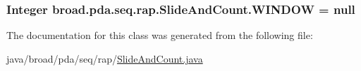 \hypertarget{classbroad_1_1pda_1_1seq_1_1rap_1_1_slide_and_count_a9be89664b1e7b15d1a5a5e9bfae6b3cb}{
\subsubsection[{W\+I\+N\+D\+O\+W}]{\setlength{\rightskip}{0pt plus 5cm}Integer broad.\+pda.\+seq.\+rap.\+Slide\+And\+Count.\+W\+I\+N\+D\+O\+W = null}}\label{classbroad_1_1pda_1_1seq_1_1rap_1_1_slide_and_count_a9be89664b1e7b15d1a5a5e9bfae6b3cb}


The documentation for this class was generated from the following file\+:\begin{DoxyCompactItemize}
\item 
java/broad/pda/seq/rap/\hyperlink{_slide_and_count_8java}{Slide\+And\+Count.\+java}\end{DoxyCompactItemize}
